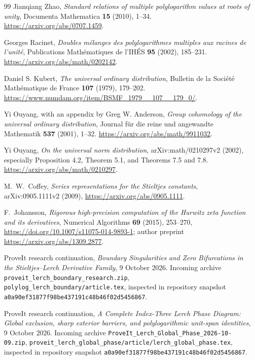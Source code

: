 \documentclass[11pt,a4paper]{article}
\numberwithin{equation}{section}
\theoremstyle{definition}
\theoremstyle{remark}
\begin{document}
\begin{thebibliography}{99}
Jianqiang Zhao,
\emph{Standard relations of multiple polylogarithm values at roots of unity},
Documenta Mathematica \textbf{15} (2010), 1--34.
\url{https://arxiv.org/abs/0707.1459}.

Georges Racinet,
\emph{Doubles m\'elanges des polylogarithmes multiples aux racines de l'unit\'e},
Publications Math\'ematiques de l'IH\'ES \textbf{95} (2002), 185--231.
\url{https://arxiv.org/abs/math/0202142}.


Daniel S. Kubert,
\emph{The universal ordinary distribution},
Bulletin de la Soci\'et\'e Math\'ematique de France
\textbf{107} (1979), 179--202.
\url{https://www.numdam.org/item/BSMF_1979__107__179_0/}.

Yi Ouyang, with an appendix by Greg W. Anderson,
\emph{Group cohomology of the universal ordinary distribution},
Journal f\"ur die reine und angewandte Mathematik
\textbf{537} (2001), 1--32.
\url{https://arxiv.org/abs/math/9911032}.

Yi Ouyang,
\emph{On the universal norm distribution},
arXiv:math/0210297v2 (2002), especially Proposition 4.2,
Theorem 5.1, and Theorems 7.5 and 7.8.
\url{https://arxiv.org/abs/math/0210297}.


M.~W.~Coffey,
\emph{Series representations for the Stieltjes constants},
arXiv:0905.1111v2 (2009),
\url{https://arxiv.org/abs/0905.1111}.

F.~Johansson,
\emph{Rigorous high-precision computation of the Hurwitz zeta function
and its derivatives},
Numerical Algorithms \textbf{69} (2015), 253--270,
\url{https://doi.org/10.1007/s11075-014-9893-1};
author preprint \url{https://arxiv.org/abs/1309.2877}.

ProveIt research continuation,
\emph{Boundary Singularities and Zero Bifurcations in the Stieltjes--Lerch
Derivative Family}, 9 October 2026.
Incoming archive \texttt{proveit\_lerch\_boundary\_research.zip},
\texttt{polylog\_lerch\_boundary/article.tex}, inspected in repository
snapshot \texttt{a0a90ef31877f98be437191c48b46f02d5456867}.

ProveIt research continuation,
\emph{A Complete Index-Three Lerch Phase Diagram: Global exclusion,
sharp exterior barriers, and polylogarithmic unit-span identities},
9 October 2026. Incoming archive
\texttt{ProveIt\_Lerch\_Global\_Phase\_2026-10-09.zip},
\texttt{proveit\_lerch\_global\_phase/article/lerch\_global\_phase.tex},
inspected in repository snapshot
\texttt{a0a90ef31877f98be437191c48b46f02d5456867}.


\end{thebibliography}
\end{document}
